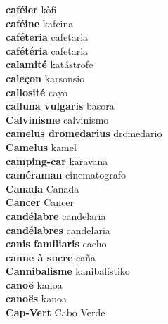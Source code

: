 \textbf{ caféier  } kòfi \\
\textbf{ caféine  } kafeina \\
\textbf{ caféteria  } cafetaria \\
\textbf{ cafétéria  } cafetaria \\
\textbf{ calamité  } katástrofe \\
\textbf{ caleçon  } karsonsio \\
\textbf{ callosité  } cayo \\
\textbf{ calluna vulgaris  } basora \\
\textbf{ Calvinisme  } calvinismo \\
\textbf{ camelus dromedarius  } dromedario \\
\textbf{ Camelus  } kamel \\
\textbf{ camping-car  } karavana \\
\textbf{ caméraman  } cinematografo \\
\textbf{ Canada  } Canada \\
\textbf{ Cancer  } Cancer \\
\textbf{ candélabre  } candelaria \\
\textbf{ candélabres  } candelaria \\
\textbf{ canis familiaris  } cacho \\
\textbf{ canne à sucre  } caña \\
\textbf{ Cannibalisme  } kanibalístiko \\
\textbf{ canoë  } kanoa \\
\textbf{ canoës  } kanoa \\
\textbf{ Cap-Vert  } Cabo Verde \\
